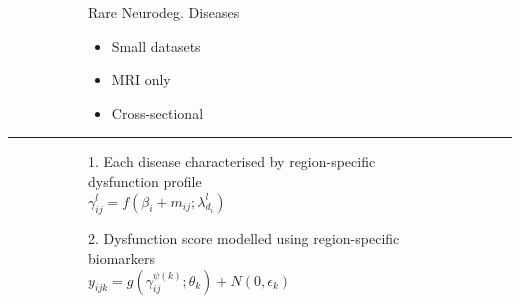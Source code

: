 \documentclass[portrait,a0,final,20pt]{a0poster}
\newcommand{\fnt}[1]{\LARGE{#1}}
\begin{document}
{\begin{multicols}{2}
\begin{figure}[H]
{\begin{subfigure}{0.48\columnwidth}
\begin{itemize}
  \end{itemize}
\end{subfigure}
\begin{subfigure}{0.48\columnwidth}
 
   Rare Neurodeg. Diseases
  
  \begin{itemize}
   \item Small datasets \no
   \item MRI only \no
   \item Cross-sectional \no
  \end{itemize}
 
\end{subfigure}
 }
\end{figure}

\end{multicols}
\hrule

\begin{multicols}{2}							
\raggedcolumns	

 
\vspace{0.6em}
\begin{figure}[H]
 \centering
   \begin{subfigure}{0.49\columnwidth}
   \centering
   \fnt{1. Each disease characterised by region-specific dysfunction profile}\\
   $ \gamma_{ij}^l = f(\beta_{i} + m_{ij}; \lambda_{d_i}^l) $\\
   
  \end{subfigure}
  \begin{subfigure}{0.49\columnwidth}
   \centering
   \fnt{2. Dysfunction score modelled using region-specific biomarkers}\\
   $ y_{ijk} = g( \gamma_{ij}^{\psi(k)} ; \theta_k) + N(0,\epsilon_k) $
  \end{subfigure}


\end{figure}
\end{multicols}}
\end{document}
